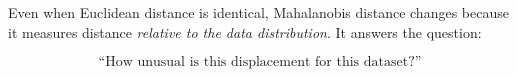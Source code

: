 \documentclass{article}
\begin{document}
\bigskip

Even when Euclidean distance is identical, Mahalanobis distance changes
because it measures distance \textit{relative to the data distribution}.
It answers the question:

\[
\text{``How unusual is this displacement for this dataset?''}
\]





\end{document}
